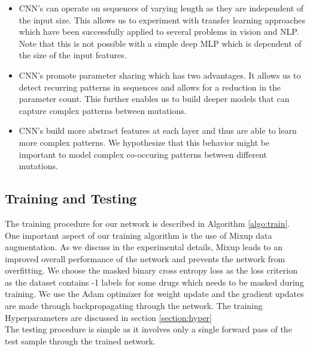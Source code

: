 \documentclass{article}
\begin{document}
\begin{itemize}
    \item CNN's can operate on sequences of varying length as they are independent of the input size. 
    This allows us to
    experiment with transfer learning approaches which have been successfully applied to several problems in 
    vision and
    NLP.
    Note that this is not possible with a simple deep MLP which is dependent of the size of the input features.
    \item CNN's promote parameter sharing which has two advantages. It allows us to detect recurring patterns in
    sequences and allows for a reduction in the parameter count. This further enables us to build deeper models that
    can capture complex patterns between mutations.
    \item CNN's build more abstract features at each layer and thus are able to learn more complex patterns. 
    We hypothesize
    that this behavior might be important to model complex co-occuring patterns between different mutations. 
\end{itemize}

\subsection{Training and Testing}

The training procedure for our network is described in Algorithm \ref{algo:train}. One
important aspect of our training algorithm is the use of Mixup \cite{DBLP:journals/corr/abs-1710-09412} data augmentation. As we discuss in the
experimental details, Mixup leads to an improved overall performance of the network and prevents the
network from overfitting. We choose the masked binary cross entropy loss as the loss criterion
as the dataset contains -1 labels for some drugs which needs to be masked during training.
We use the Adam \cite{kingma2017adam} optimizer for weight update and the gradient updates are made through backpropagating through
the network. The training Hyperparameters are discussed in section \ref{section:hyper}\\
The testing procedure is simple as it involves only a single forward pass of the test sample through
the trained network.
\end{document}
